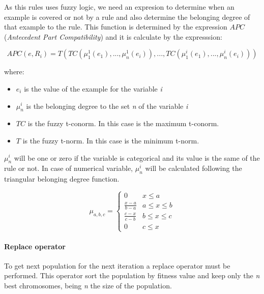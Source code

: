 \documentclass[]{article}
\begin{document}
As this rules uses fuzzy logic, we need an expresion to determine when
an example is covered or not by a rule and also determine the belonging
degree of that example to the rule. This function is determined by the
expression $APC$ (\emph{Antecedent Part Compatibility}) and it is
calculate by the expresssion:

\begin{equation} APC(e, R_i) = T(TC(\mu _{1}^{1}(e_1), ... , \mu _{n}^{1}(e_i)), ... , TC(\mu _{1}^{i}(e_1), ... , \mu _{n}^{i}(e_i))) \label{APC} \end{equation}

where:

\begin{itemize}
  \item $e_i$ is the value of the example for the variable \textit{i}
  \item $\mu_{n}^{i}$ is the belonging degree to the set \textit{n} of the variable \textit{i}
  \item $TC$ is the fuzzy t-conorm. In this case is the maximum t-conorm.
  \item $T$ is the fuzzy t-norm. In this case is the minimum t-norm.
\end{itemize}

$\mu_{n}^{i}$ will be one or zero if the variable is categorical and its
value is the same of the rule or not. In case of numerical variable,
$\mu_{n}^{i}$ will be calculated following the triangular belonging
degree function.

\begin{equation} 
\mu_{a,b,c} = \left\{\begin{matrix}
0 & x \leq a\\ 
\frac{x-a}{b-a} &  a \leq x \leq b\\ 
 \frac{c-x}{c-b}&  b \leq  x \leq  c\\ 
 0 &   c \leq  x
\end{matrix}\right.
\end{equation}

\paragraph{Replace operator}\label{replace-operator}

To get next population for the next iteration a replace operator must be
performed. This operator sort the population by fitness value and keep
only the \emph{n} best chromosomes, being \emph{n} the size of the
population.
\end{document}
